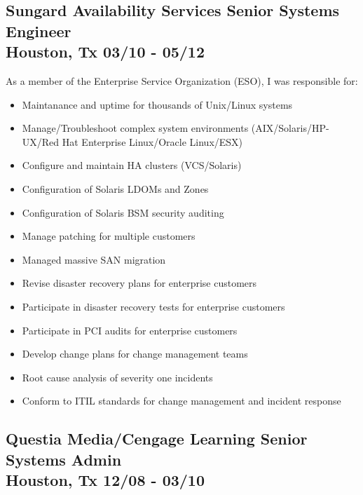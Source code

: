 \documentclass{article}
\begin{document}
  \subsection{Sungard Availability Services \hfill Senior Systems Engineer\\
    Houston, Tx \hfill 03/10 - 05/12
  }

  As a member of the Enterprise Service Organization (ESO), I was responsible for:\\
  \begin{itemize}
  \item Maintanance and uptime for thousands of Unix/Linux systems
  \item Manage/Troubleshoot complex system environments (AIX/Solaris/HP-UX/Red Hat Enterprise Linux/Oracle Linux/ESX)
  \item Configure and maintain HA clusters (VCS/Solaris)
  \item Configuration of Solaris LDOMs and Zones
  \item Configuration of Solaris BSM security auditing
  \item Manage patching for multiple customers
  \item Managed massive SAN migration
  \item Revise disaster recovery plans for enterprise customers
  \item Participate in disaster recovery tests for enterprise customers
  \item Participate in PCI audits for enterprise customers
  \item Develop change plans for change management teams
  \item Root cause analysis of severity one incidents
  \item Conform to ITIL standards for change management and incident response
  \end{itemize}


  \subsection{Questia Media/Cengage Learning \hfill Senior Systems Admin\\
    Houston, Tx \hfill 12/08 - 03/10
  }
\end{document}
